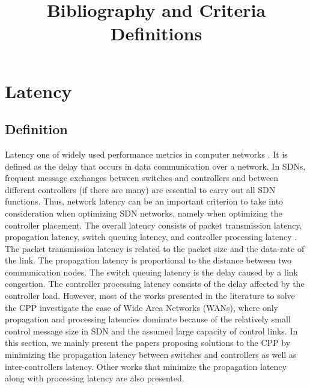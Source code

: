 \documentclass[a4paper,10pt]{article}
\title{Bibliography and Criteria Definitions}
\author{}
\begin{document}
\maketitle

\section{Latency}
\subsection{Definition}
Latency one of widely used performance metrics in computer networks \cite{SiHa15}. It is defined as the delay that occurs in data communication over a network. In SDNs, frequent message exchanges between switches and controllers and between different controllers (if there are many) are essential to carry out all SDN functions. Thus, network latency can be an important criterion to take into consideration when optimizing SDN networks, namely when optimizing the controller placement. The overall latency consists of packet transmission latency, propagation latency, switch queuing latency, and controller processing latency \cite{WaZh17}. The packet transmission latency is related to the packet size and the data-rate of the link. The propagation latency is proportional to the distance between two communication nodes. The switch queuing latency is the delay caused by a link congestion. The controller processing latency consists of the delay affected by the controller load. However, most of the works presented in the literature to solve the CPP investigate the case of Wide Area Networks (WANs), where only propagation and processing latencies dominate because of the relatively small control message size in SDN and the assumed large capacity of control links. In this section, we mainly present the papers proposing solutions to the CPP by minimizing the propagation latency between switches and controllers as well as inter-controllers latency. Other works that minimize the propagation latency along with processing latency are also presented.


\end{document}
